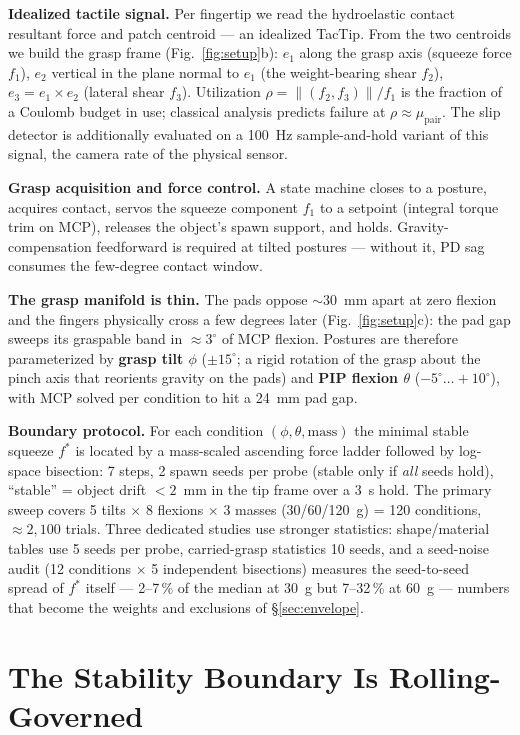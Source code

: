 \documentclass[journal]{IEEEtran}
\newcommand{\mupair}{\mu_{\mathrm{pair}}}
\newcommand{\fstar}{f^{*}}
\begin{document}
\textbf{Idealized tactile signal.} Per fingertip we read the hydroelastic
contact resultant force and patch centroid --- an idealized TacTip. From
the two centroids we build the grasp frame (Fig.~\ref{fig:setup}b): $e_1$
along the grasp axis (squeeze force $f_1$), $e_2$ vertical in the plane
normal to $e_1$ (the weight-bearing shear $f_2$),
$e_3 = e_1 \times e_2$ (lateral shear $f_3$). Utilization
$\rho = \lVert (f_2, f_3) \rVert / f_1$ is the fraction of a Coulomb budget
in use; classical analysis predicts failure at $\rho \approx \mupair$. The
slip detector is additionally evaluated on a 100~Hz sample-and-hold variant
of this signal, the camera rate of the physical sensor.

\textbf{Grasp acquisition and force control.} A state machine closes to a
posture, acquires contact, servos the squeeze component $f_1$ to a setpoint
(integral torque trim on MCP), releases the object's spawn support, and
holds. Gravity-compensation feedforward is required at tilted postures ---
without it, PD sag consumes the few-degree contact window.

\textbf{The grasp manifold is thin.} The pads oppose ${\sim}30$~mm apart at
zero flexion and the fingers physically cross a few degrees later
(Fig.~\ref{fig:setup}c): the pad gap sweeps its graspable band in
${\approx}3^\circ$ of MCP flexion. Postures are therefore parameterized by
\textbf{grasp tilt $\phi$} ($\pm 15^\circ$; a rigid rotation of the grasp
about the pinch axis that reorients gravity on the pads) and \textbf{PIP
flexion $\theta$} ($-5^\circ \ldots +10^\circ$), with MCP solved per
condition to hit a 24~mm pad gap.

\textbf{Boundary protocol.} For each condition $(\phi,\theta,\mathrm{mass})$
the minimal stable squeeze $\fstar$ is located by a mass-scaled ascending
force ladder followed by log-space bisection: 7 steps, 2 spawn seeds per
probe (stable only if \emph{all} seeds hold), ``stable'' = object drift
$< 2$~mm in the tip frame over a 3~s hold. The primary sweep covers 5 tilts
$\times$ 8 flexions $\times$ 3 masses (30/60/120~g) = 120 conditions,
${\approx}2{,}100$ trials. Three dedicated studies use stronger statistics:
shape/material tables use 5 seeds per probe, carried-grasp statistics 10
seeds, and a seed-noise audit (12 conditions $\times$ 5 independent
bisections) measures the seed-to-seed spread of $\fstar$ itself ---
2--7\,\% of the median at 30~g but 7--32\,\% at 60~g --- numbers that
become the weights and exclusions of \S\ref{sec:envelope}.

\section{The Stability Boundary Is Rolling-Governed}
\label{sec:rolling}
\end{document}
